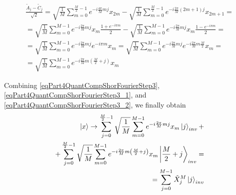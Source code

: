 \begin{eqnarray}
\frac{\tilde{A}_{j} - \tilde{C}_{j} }{\sqrt{2}} = 
\sqrt{\frac{1}{M}} 
\sum_{m = 0}^{\frac{M}{2} - 1} e^{-i \frac{4 \pi}{M} m j} x_{2m}  -
\sqrt{\frac{1}{M}} 
\sum_{m = 0}^{\frac{M}{2} - 1} 
e^{-i \frac{2 \pi}{M} \left(2m+1\right) j} x_{2m+1}
= 
\nonumber \\
=
\sqrt{\frac{1}{M}} \sum_{m = 0}^{M - 1}
e^{-i \frac{2 \pi}{M} m j} x_{m} \frac{1 + e^{-i \pi m}}{2}
-
\sqrt{\frac{1}{M}} \sum_{m = 0}^{M - 1}
e^{-i \frac{2 \pi}{M} m j} x_{m} \frac{1 - e^{-i \pi m}}{2} 
=
\nonumber \\
=
\sqrt{\frac{1}{M}} \sum_{m = 0}^{M - 1}
e^{-i \frac{2 \pi}{M} m j} e^{-i \pi m } x_{m} 
=
\sqrt{\frac{1}{M}} \sum_{m = 0}^{M - 1}
e^{-i \frac{2 \pi}{M} m j} e^{-i \frac{2 \pi}{M} m \frac{M}{2} } x_{m} 
=
\nonumber \\
=
\sqrt{\frac{1}{M}} \sum_{m = 0}^{M - 1}
e^{-i \frac{2 \pi}{M} m \left(\frac{M}{2} + j\right)} x_{m}
\label{eqPart4QuantCompShorFourierStep3_2}
\end{eqnarray}

Combining \eqref{eqPart4QuantCompShorFourierStep3}, \eqref{eqPart4QuantCompShorFourierStep3_1}, and \eqref{eqPart4QuantCompShorFourierStep3_2}, we finally obtain 
\begin{eqnarray}
\ket{x} \rightarrow
\sum_{j = 0}^{\frac{M}{2} - 1} \sqrt{\frac{1}{M}} \sum_{m = 0}^{M - 1}
e^{-i \frac{2 \pi}{M} m j} x_{m} \ket{j}_{inv} +
\nonumber \\
+
\sum_{j = 0}^{\frac{M}{2} - 1} \sqrt{\frac{1}{M}} \sum_{m = 0}^{M - 1}
e^{-i \frac{2 \pi}{M} m \left(\frac{M}{2} + j\right)} x_{m} 
\left|\frac{M}{2} + j\right>_{inv} =
\nonumber \\
= \sum_{j = 0}^{M - 1} \tilde{X}_j^{M} \ket{j}_{inv}
\nonumber
\end{eqnarray}
